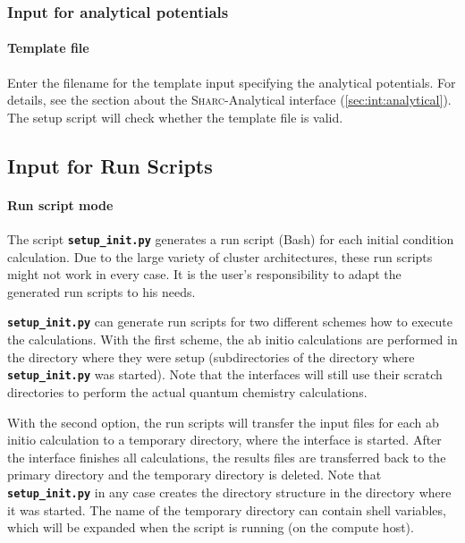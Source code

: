 \documentclass[a4paper,10pt,DIV=15,openany,twoside=false]{scrbook}
\newcommand{\sharc}{\textsc{Sharc}}
\newcommand{\ttt}[1]{\textbf{\texttt{#1}}}
\begin{document}
\subsubsection{Input for analytical potentials}\label{sec:setup_init.py:analytical}

\paragraph{Template file}

Enter the filename for the template input specifying the analytical potentials. For details, see the section about the \sharc-Analytical interface (\ref{sec:int:analytical}). The setup script will check whether the template file is valid. 






\subsection{Input for Run Scripts}\label{sec:setup_init.py:run}

\paragraph{Run script mode}

The script \ttt{setup\_init.py} generates a run script (Bash) for each initial condition calculation. Due to the large variety of cluster architectures, these run scripts might not work in every case. It is the user's responsibility to adapt the generated run scripts to his needs.

\ttt{setup\_init.py} can generate run scripts for two different schemes how to execute the calculations. With the first scheme, the ab initio calculations are performed in the directory where they were setup (subdirectories of the directory where \ttt{setup\_init.py} was started). Note that the interfaces will still use their scratch directories to perform the actual quantum chemistry calculations.

With the second option, the run scripts will transfer the input files for each ab initio calculation to a temporary directory, where the interface is started. After the interface finishes all calculations, the results files are transferred back to the primary directory and the temporary directory is deleted. Note that \ttt{setup\_init.py} in any case creates the directory structure in the directory where it was started. The name of the temporary directory can contain shell variables, which will be expanded when the script is running (on the compute host).
\end{document}
